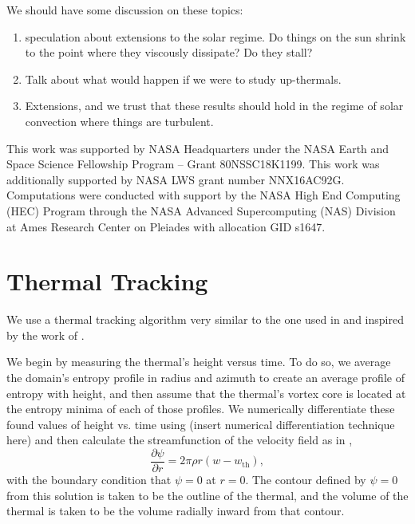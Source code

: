 \documentclass[twocolumn, amsmath, amsfonts, amssymb, trackchanges]{aastex62}
\begin{document}
We should have some discussion on these topics:
\begin{enumerate}
\item speculation about extensions to the solar regime. Do things on the sun shrink to the point where they viscously dissipate? Do they stall?
\item Talk about what would happen if we were to study up-thermals.
\item Extensions, and we trust that these results should hold in the regime of solar convection where things are turbulent.
\end{enumerate}

\begin{acknowledgements}
This work was supported by NASA Headquarters under the NASA Earth and Space Science Fellowship Program -- Grant 80NSSC18K1199.
This work was additionally supported by  NASA LWS grant number NNX16AC92G.  
Computations were conducted with support by the NASA High End Computing (HEC) Program through the NASA  Advanced Supercomputing (NAS) Division at Ames Research Center on Pleiades with allocation GID s1647.
\end{acknowledgements}

\appendix
\section{Thermal Tracking}
\label{appendix:tracking}
We use a thermal tracking algorithm very similar to the one used in  \citet{lecoanet&jeevanjee2018} and inspired by the work of \citet{romps&all2015}. 

We begin by measuring the thermal's height versus time. 
To do so, we average the domain's entropy profile in radius and azimuth to create an average profile of entropy with height, and then assume that the thermal's vortex core is located at the entropy minima of each of those profiles.
We numerically differentiate these found values of height vs. time using (insert numerical differentiation technique here) and then calculate the streamfunction of the velocity field as in \citet{romps&all2015},
\begin{equation}
\frac{\partial \psi}{\partial r} = 2\pi \rho r (w - w_{\text{th}}),
\end{equation}
with the boundary condition that $\psi = 0$ at $r = 0$. The contour defined by $\psi = 0$ from this solution is taken to be the outline of the thermal, and the volume of the thermal is taken to be the volume radially inward from that contour.
\end{document}
